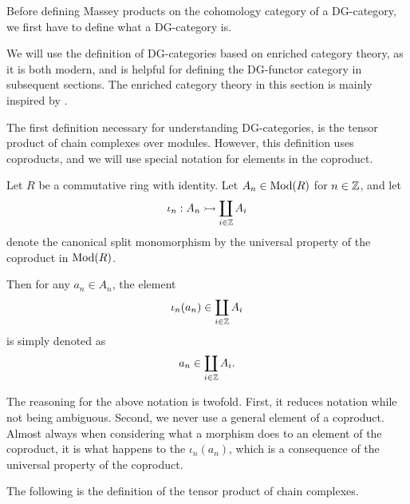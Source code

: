 Before defining Massey products on the cohomology category of a DG-category, we first have to define what a DG-category is.

We will use the definition of DG-categories based on enriched category theory, as it is both modern, and is helpful for defining the DG-functor category in subsequent sections. The enriched category theory in this section is mainly inspired by \cite[Section 6.2]{Borceux_1994}.

The first definition necessary for understanding DG-categories, is the tensor product of chain complexes over modules. However, this definition uses coproducts, and we will use special notation for elements in the coproduct.

\begin{notation}
    \label{not:coprod}
    Let \( R \) be a commutative ring with identity. Let \( A_n \in \operatorname{Mod}(R) \) for \( n \in {\mathbb{Z}} \), and let
    \[
        \iota_n: A_n \rightarrowtail \coprod_{i \in {\mathbb{Z}}} A_i
    \]
    denote the canonical split monomorphism by the universal property of the coproduct in \( \operatorname{Mod}(R) \).

    Then for any \( a_n \in A_n \), the element
    \[
        \iota_n(a_n) \in \coprod_{i \in {\mathbb{Z}}} A_i
    \]
    is simply denoted as
    \[
        a_n \in \coprod_{i \in {\mathbb{Z}}} A_i.
    \]
\end{notation}

The reasoning for the above notation is twofold. First, it reduces notation while not being ambiguous. Second, we never use a general element of a coproduct. Almost always when considering what a morphism does to an element of the coproduct, it is what happens to the \( \iota_n(a_n) \), which is a consequence of the universal property of the coproduct.

The following is the definition of the tensor product of chain complexes.

